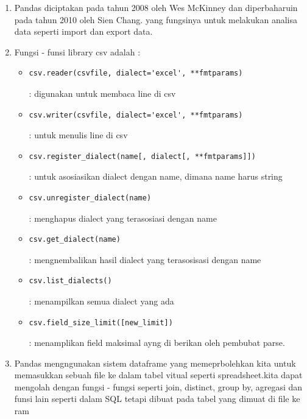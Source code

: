\begin{enumerate}
	\item Pandas diciptakan pada tahun 2008 oleh Wes McKinney dan diperbaharuin pada tahun 2010 oleh Sien Chang. yang fungsinya untuk melakukan analisa data seperti import dan export data.

	\item Fungsi - funsi library csv adalah :
		\begin{itemize}
			
			\item \begin{verbatim}csv.reader(csvfile, dialect='excel', **fmtparams)\end{verbatim} : digunakan untuk membaca line di csv
			\item \begin{verbatim}csv.writer(csvfile, dialect='excel', **fmtparams)\end{verbatim} : untuk menulis line di csv
			\item \begin{verbatim}csv.register_dialect(name[, dialect[, **fmtparams]]) \end{verbatim}: untuk asosiasikan dialect dengan name, dimana name harus string
			\item \begin{verbatim}csv.unregister_dialect(name)\end{verbatim} : menghapus dialect yang terasosiasi dengan name
			\item \begin{verbatim}csv.get_dialect(name)\end{verbatim} : mengnembalikan hasil dialect yang terasosisasi dengan name
			\item \begin{verbatim}csv.list_dialects() \end{verbatim}: menampilkan semua dialect yang ada
			\item \begin{verbatim}csv.field_size_limit([new_limit])\end{verbatim} : menamplikan field maksimal ayng di berikan oleh pembubat parse.

		\end{itemize}

	\item Pandas mengngunakan sistem dataframe yang memeprbolehkan kita untuk memasukkan sebuah file ke dalam tabel vitual seperti spreadsheet.kita dapat mengolah dengan fungsi - fungsi  seperti join, distinct, group by, agregasi dan funsi lain seperti dalam SQL tetapi dibuat pada tabel yang dimuat di file ke ram
	\end{enumerate}

